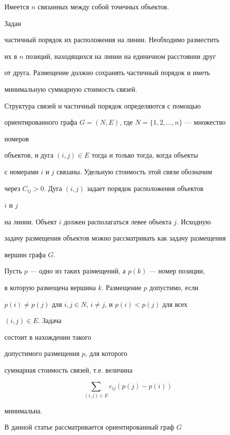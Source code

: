 Имеется $n$ связанных между собой точечных объектов.


Задан


частичный порядок их расположения на линии. Необходимо разместить


их в $n$ позиций, находящихся на линии на единичном расстоянии друг


от друга. Размещение должно сохранять частичный порядок и иметь


минимальную суммарную стоимость связей.





Структура связей и частичный порядок определяются с помощью


ориентированного графа $G=(N,E)$, где $N=\{1,2,\dotsc,n\}$ --- множество


номеров


объектов, и дуга $(i,j)\in E$ тогда и только тогда, когда объекты


с номерами $i$ и $j$ связаны. Удельную стоимость этой связи обозначим


через $C_{ij}>0$. Дуга $(i,j)$ задает порядок расположения объектов


$i$ и $j$


на линии. Объект $i$ должен располагаться левее объекта $j$. Исходную


задачу размещения объектов можно рассматривать как задачу размещения


вершин графа $G$.





Пусть $p$ --- одно из таких размещений, а $p(k)$ --- номер позиции,


в которую размещена вершина $k$. Размещение $p$ допустимо, если


$p(i)\ne p(j)$ для $i,j\in N$, $i\ne j$, и $p(i)<p(j)$ для всех


$(i,j)\in E$. Задача


состоит в нахождении такого


допустимого размещения $p$, для которого


суммарная стоимость связей, т.е. величина


$$


\sum_{(i,j)\in E} c_{ij}(p(j)-p(i))


$$


минимальна.





В данной статье рассматривается ориентированный граф $G$


